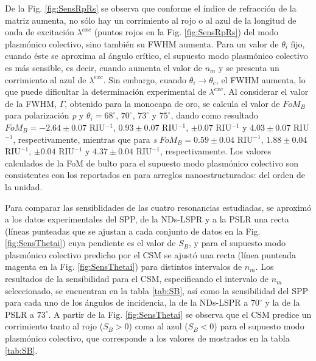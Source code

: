 De la Fig. \ref{fig:SensRpRs} se observa que conforme el índice de refracción de la matriz aumenta, no sólo hay un corrimiento al rojo o al azul de la longitud de onda de excitación $\lambda^{exc}$  (puntos rojos en la Fig. \ref{fig:SensRpRs}) del modo plasmónico colectivo,  sino también  su FWHM  aumenta. Para un valor de $\theta_i$ fijo, cuando éste se aproxima al ángulo crítico, el supuesto modo  plasmónico colectivo es más sensible, es decir, cuando aumenta el valor de $n_m$ y se presenta un corrimiento al azul de $\lambda^{exc}$. Sin embargo, cuando $\theta_i\to\theta_c$, el FWHM aumenta, lo que puede dificultar la determinación experimental de $\lambda^{exc}$. Al considerar el valor de la FWHM, $\Gamma$, obtenido para la monocapa de oro, se calcula el valor de $\textit{FoM}_B$ para polarización \emph{p} y $\theta_i=68^\circ,\, 70^\circ,\, 73^\circ$ y $75^\circ$, dando como resultado  $\textit{FoM}_B= -2.64\pm0.07$ RIU$^{-1}$, $0.93 \pm0.07$ RIU$^{-1}$, $ \pm0.07$ RIU$^{-1}$ y $4.03\pm0.07$ RIU$^{-1}$, respectivamente, mientras que para \emph{s} $\textit{FoM}_B= 0.59\pm0.04$ RIU$^{-1}$, $1.88 \pm0.04$ RIU$^{-1}$, $ \pm0.04 $ RIU$^{-1}$ y $4.37\pm0.04$ RIU$^{-1}$, respectivamente. Los valores calculados de la FoM de bulto para el supuesto modo plasmónico colectivo son consistentes con los reportados en \cite{svedendahl2009refractometric} para arreglos nanoestructurados: del orden de la unidad.

 Para comparar las sensiblidades de las cuatro resonancias estudiadas, se aproximó a los datos experimentales del SPP, de la NDs-LSPR y a la PSLR una recta (líneas punteadas que se ajustan a cada conjunto de datos en la Fig. \ref{fig:SensThetai}) cuya pendiente es el valor de $S_B$, y para el supuesto modo  plasmónico colectivo predicho por el CSM se ajustó una recta (línea punteada magenta en la Fig. \ref{fig:SensThetai}) para distintos intervalos de $n_m$. Los resultados de la sensibilidad para el CSM, especificando el  intervalo de $n_m$ seleccionado, se  encuentran en la tabla \ref{tab:SB}, así como la sensibilidad del SPP para cada uno de los ángulos de incidencia, la de la NDs-LSPR a $70^\circ$ y la de la PSLR a $73^\circ$. A partir de la Fig. \ref{fig:SensThetai} se observa que el  CSM predice un corrimiento tanto al  rojo ($S_B>0$) como al azul ($S_B<0$) para el supuesto modo plasmónico colectivo, que corresponde a los valores de mostrados en la tabla \ref{tab:SB}.

